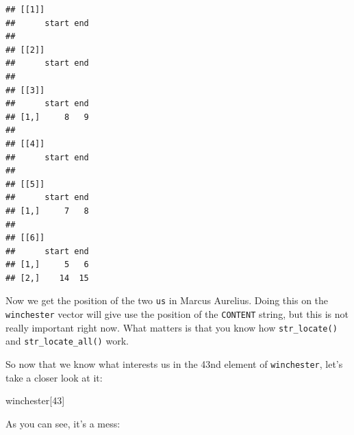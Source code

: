 \documentclass[]{gitbook}
\newenvironment{Shaded}{\begin{snugshade}}{\end{snugshade}}
\newcommand{\DecValTok}[1]{\textcolor[rgb]{0.00,0.00,0.81}{#1}}
\newcommand{\KeywordTok}[1]{\textcolor[rgb]{0.13,0.29,0.53}{\textbf{#1}}}
\newcommand{\NormalTok}[1]{#1}
\newcommand{\OperatorTok}[1]{\textcolor[rgb]{0.81,0.36,0.00}{\textbf{#1}}}
\newcommand{\StringTok}[1]{\textcolor[rgb]{0.31,0.60,0.02}{#1}}
\begin{document}
\begin{Shaded}
\end{Shaded}

\begin{verbatim}
## [[1]]
##      start end
## 
## [[2]]
##      start end
## 
## [[3]]
##      start end
## [1,]     8   9
## 
## [[4]]
##      start end
## 
## [[5]]
##      start end
## [1,]     7   8
## 
## [[6]]
##      start end
## [1,]     5   6
## [2,]    14  15
\end{verbatim}

Now we get the position of the two \texttt{us} in Marcus Aurelius. Doing this on the \texttt{winchester} vector
will give use the position of the \texttt{CONTENT} string, but this is not really important right now. What
matters is that you know how \texttt{str\_locate()} and \texttt{str\_locate\_all()} work.

So now that we know what interests us in the 43nd element of \texttt{winchester}, let's take a closer
look at it:

\begin{Shaded}
\begin{Highlighting}[]
\NormalTok{winchester[}\DecValTok{43}\NormalTok{]}
\end{Highlighting}
\end{Shaded}

As you can see, it's a mess:
\end{document}
